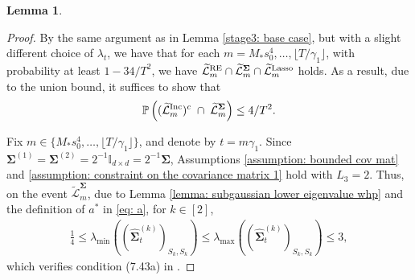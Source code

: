 \documentclass[aos,preprint]{imsart}
\theoremstyle{plain}
\newtheorem{lemma}[theorem]{Lemma}
\theoremstyle{definition}
\newcommand{\bSigma}{\boldsymbol{\Sigma}}
\newcommand{\lmin}[1]{\lambda_{\min}\left(#1\right)}
\newcommand{\lmax}[1]{\lambda_{\max}\left(#1\right)}
\newcommand{\hbSigma}{\hat{\boldsymbol{\Sigma}}}
\newcommand{\Pro}{\mathbb{P}}
\newcommand{\tL}{\widetilde{\mathcal{L}}}
\begin{document}
\begin{appendix}
\begin{lemma}
\end{lemma}
\begin{proof}
By the same argument as in Lemma \ref{stage3: base case}, but with a slight different choice of $\lambda_t$, we have that for each $m = M_* s_0^4,\ldots, \lfloor T/\gamma_1 \rfloor$, with probability at least $1-34/T^2$, we have 
$\tL_m^{\textup{RE}} \cap \tL_m^{\bSigma} \cap  \tL_m^{\textup{Lasso}}$ holds. As a result, due to the union bound, it suffices to show that 
\begin{align*}
\Pro\left((\tL_m^{\textup{Inc}} )^c\; \cap \; \tL_m^{\bSigma}\right) \leq 4/T^2.
\end{align*}

Fix $m \in \{M_*s_0^4,\ldots,\lfloor T/\gamma_1 \rfloor\}$, and denote by $t = m \gamma_1$. Since $\bSigma^{(1)} = \bSigma^{(2)} = 2^{-1}\mathbb{I}_{d\times d} = 2^{-1} \bSigma$,  Assumptions  \ref{assumption: bounded cov mat} and \ref{assumption: constraint on the covariance matrix 1} hold with $L_3 = 2$. Thus, on the event $\tL_m^{\bSigma}$, due to Lemma \ref{lemma: subgaussian lower eigenvalue whp} and the definition of $a^*$ in \eqref{eq: a},  for $k \in [2]$,
\begin{align}\label{aux:eign}
   \frac{1}{4} \le \lmin{(\hbSigma_{t}^{(k)})_{S_k, S_k}} \le \lmax{(\hbSigma_{t}^{(k)})_{S_k, S_k}} \le 3,
\end{align}
which verifies condition (7.43a) in \cite{wainwright2019high}.


\end{proof}
\end{appendix}
\end{document}
